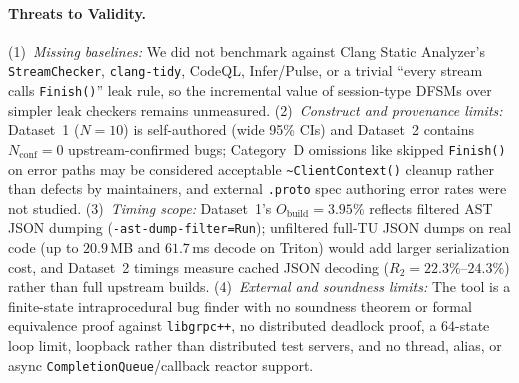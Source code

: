 \paragraph{Threats to Validity.}
(1)~\emph{Missing baselines:} We did not benchmark against Clang Static Analyzer's \texttt{StreamChecker}, \texttt{clang-tidy}, CodeQL, Infer/Pulse, or a trivial ``every stream calls \texttt{Finish()}'' leak rule, so the incremental value of session-type DFSMs over simpler leak checkers remains unmeasured. (2)~\emph{Construct and provenance limits:} Dataset~1 ($N=10$) is self-authored (wide 95\% CIs) and Dataset~2 contains $N_{\mathrm{conf}}=0$ upstream-confirmed bugs; Category~D omissions like skipped \texttt{Finish()} on error paths may be considered acceptable \texttt{\~{}ClientContext()} cleanup rather than defects by maintainers, and external \texttt{.proto} spec authoring error rates were not studied. (3)~\emph{Timing scope:} Dataset~1's $O_{\mathrm{build}}=3.95\%$ reflects filtered AST JSON dumping (\texttt{-ast-dump-filter=Run}); unfiltered full-TU JSON dumps on real code (up to $20.9$\,MB and $61.7$\,ms decode on Triton) would add larger serialization cost, and Dataset~2 timings measure cached JSON decoding ($R_2=22.3\%$--$24.3\%$) rather than full upstream builds. (4)~\emph{External and soundness limits:} The tool is a finite-state intraprocedural bug finder with no soundness theorem or formal equivalence proof against \texttt{libgrpc++}, no distributed deadlock proof, a $64$-state loop limit, loopback rather than distributed test servers, and no thread, alias, or async \texttt{CompletionQueue}/callback reactor support.
